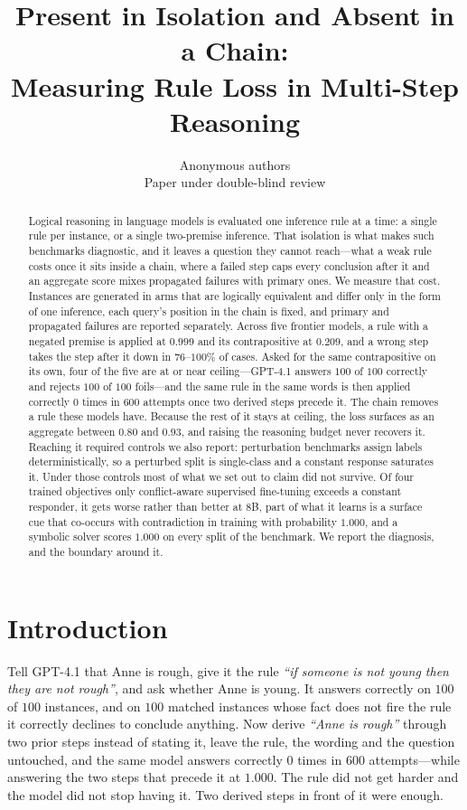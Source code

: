 \documentclass{article}
\title{Present in Isolation and Absent in a Chain:\\Measuring Rule Loss in Multi-Step Reasoning}
\author{%
Anonymous authors \\
Paper under double-blind review
}
\begin{document}
\maketitle

\begin{abstract}
Logical reasoning in language models is evaluated one inference rule at a time:
a single rule per instance, or a single two-premise inference. That isolation is
what makes such benchmarks diagnostic, and it leaves a question they cannot
reach---what a weak rule costs once it sits inside a chain, where a failed step
caps every conclusion after it and an aggregate score mixes propagated failures
with primary ones. We measure that cost. Instances are generated in arms that
are logically equivalent and differ only in the form of one inference, each
query's position in the chain is fixed, and primary and propagated failures are
reported separately. Across five frontier models, a rule with a negated
premise is applied at $0.999$ and its contrapositive at $0.209$, and a wrong
step takes the step after it down in $76$--$100\%$ of cases. Asked for the same
contrapositive on its own, four of the five are at or near ceiling---GPT-4.1
answers $100$ of $100$ correctly and rejects $100$ of $100$ foils---and the same
rule in the same words is then applied correctly $0$ times in $600$ attempts
once two derived steps precede it. The chain removes a rule these models have.
Because the rest of it stays at ceiling, the loss surfaces as an aggregate
between $0.80$ and $0.93$, and raising the reasoning budget never recovers it. Reaching it required
controls we also report: perturbation benchmarks assign labels deterministically,
so a perturbed split is single-class and a constant response saturates it. Under
those controls most of what we set out to claim did not survive. Of four trained
objectives only conflict-aware supervised fine-tuning exceeds a constant
responder, it gets worse rather than better at $8$B, part of what it learns is a
surface cue that co-occurs with contradiction in training with probability
$1.000$, and a symbolic solver scores $1.000$ on every split of the benchmark.
We report the diagnosis, and the boundary around it.
\end{abstract}

\section{Introduction}
\label{sec:introduction}
Tell GPT-4.1 that Anne is rough, give it the rule \emph{``if someone is not
young then they are not rough''}, and ask whether Anne is young. It answers
correctly on $100$ of $100$ instances, and on $100$ matched instances whose
fact does not fire the rule it correctly declines to conclude anything. Now
derive \emph{``Anne is rough''} through two prior steps instead of stating it,
leave the rule, the wording and the question untouched, and the same model
answers correctly $0$ times in $600$ attempts---while answering the two steps
that precede it at $1.000$. The rule did not get harder and the model did not
stop having it. Two derived steps in front of it were enough.
\end{document}
